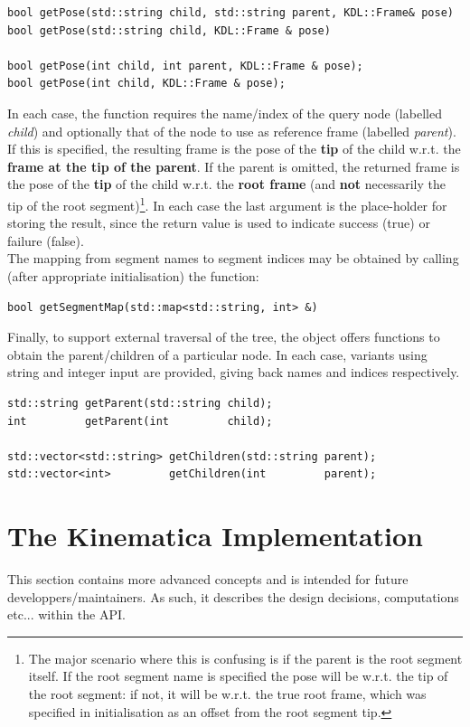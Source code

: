 \documentclass[12pt,a4paper,onecolumn]{article}
\begin{document}
\begin{lstlisting}
bool getPose(std::string child, std::string parent, KDL::Frame& pose)
bool getPose(std::string child, KDL::Frame & pose)

bool getPose(int child, int parent, KDL::Frame & pose);
bool getPose(int child, KDL::Frame & pose);
\end{lstlisting}
\noindent In each case, the function requires the name/index of the query node (labelled \textit{child}) and optionally that of the node to use as reference frame (labelled \textit{parent}). If this is specified, the resulting frame is the pose of the \textbf{tip} of the child w.r.t. the \textbf{frame at the tip of the parent}. If the parent is omitted, the returned frame is the pose of the \textbf{tip} of the child w.r.t. the \textbf{root frame} (and \textbf{not} necessarily the tip of the root segment)\footnote{The major scenario where this is confusing is if the parent is the root segment itself. If the root segment name is specified the pose will be w.r.t. the tip of the root segment: if not, it will be w.r.t. the true root frame, which was specified in initialisation as an offset from the root segment tip.}. In each case the last argument is the place-holder for storing the result, since the return value is used to indicate success (true) or failure (false).\\
\newline
\noindent The mapping from segment names to segment indices may be obtained by calling (after appropriate initialisation) the function:

\begin{lstlisting}
bool getSegmentMap(std::map<std::string, int> &)
\end{lstlisting}

\noindent Finally, to support external traversal of the tree, the object offers functions to obtain the parent/children of a particular node. In each case, variants using string and integer input are provided, giving back names and indices respectively.

\begin{lstlisting}
std::string getParent(std::string child);
int         getParent(int         child);

std::vector<std::string> getChildren(std::string parent);
std::vector<int>         getChildren(int         parent);
\end{lstlisting}

\newpage
\section{The Kinematica Implementation}
This section contains more advanced concepts and is intended for future developpers/maintainers. As such, it describes the design decisions, computations etc... within the API.
\end{document}
